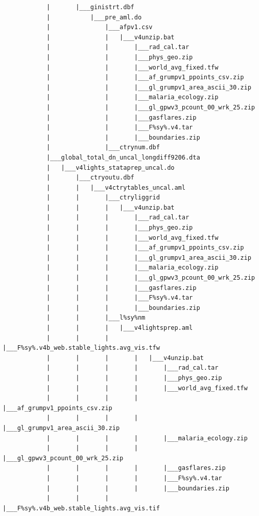 \documentclass[
]{book}
\begin{document}
\begin{verbatim}
            |       |___ginistrt.dbf
            |           |___pre_aml.do
            |               |___afpv1.csv
            |               |   |___v4unzip.bat
            |               |       |___rad_cal.tar
            |               |       |___phys_geo.zip
            |               |       |___world_avg_fixed.tfw
            |               |       |___af_grumpv1_ppoints_csv.zip
            |               |       |___gl_grumpv1_area_ascii_30.zip
            |               |       |___malaria_ecology.zip
            |               |       |___gl_gpwv3_pcount_00_wrk_25.zip
            |               |       |___gasflares.zip
            |               |       |___F%sy%.v4.tar
            |               |       |___boundaries.zip
            |               |___ctrynum.dbf
            |___global_total_dn_uncal_longdiff9206.dta
            |   |___v4lights_stataprep_uncal.do
            |       |___ctryoutu.dbf
            |       |   |___v4ctrytables_uncal.aml
            |       |       |___ctryliggrid
            |       |       |   |___v4unzip.bat
            |       |       |       |___rad_cal.tar
            |       |       |       |___phys_geo.zip
            |       |       |       |___world_avg_fixed.tfw
            |       |       |       |___af_grumpv1_ppoints_csv.zip
            |       |       |       |___gl_grumpv1_area_ascii_30.zip
            |       |       |       |___malaria_ecology.zip
            |       |       |       |___gl_gpwv3_pcount_00_wrk_25.zip
            |       |       |       |___gasflares.zip
            |       |       |       |___F%sy%.v4.tar
            |       |       |       |___boundaries.zip
            |       |       |___l%sy%nm
            |       |       |   |___v4lightsprep.aml
            |       |       |       |___F%sy%.v4b_web.stable_lights.avg_vis.tfw
            |       |       |       |   |___v4unzip.bat
            |       |       |       |       |___rad_cal.tar
            |       |       |       |       |___phys_geo.zip
            |       |       |       |       |___world_avg_fixed.tfw
            |       |       |       |       |___af_grumpv1_ppoints_csv.zip
            |       |       |       |       |___gl_grumpv1_area_ascii_30.zip
            |       |       |       |       |___malaria_ecology.zip
            |       |       |       |       |___gl_gpwv3_pcount_00_wrk_25.zip
            |       |       |       |       |___gasflares.zip
            |       |       |       |       |___F%sy%.v4.tar
            |       |       |       |       |___boundaries.zip
            |       |       |       |___F%sy%.v4b_web.stable_lights.avg_vis.tif

\end{verbatim}
\end{document}
